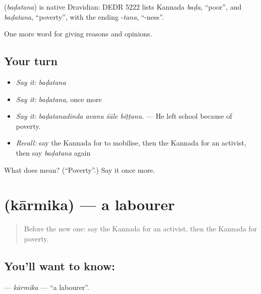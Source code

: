 \begin{cousinweb}
\textbf{} (\emph{baḍatana}) is native Dravidian: DEDR 5222 lists Kannada \emph{baḍa}, \textquotedblleft{}poor\textquotedblright{}, and \emph{baḍatana}, \textquotedblleft{}poverty\textquotedblright{}, with the ending -\emph{tana}, \textquotedblleft{}-ness\textquotedblright{}.
\end{cousinweb}

\begin{grammarlens}[title={What you've built}]
One more word for giving reasons and opinions.
\end{grammarlens}

\subsection*{Your turn}
\begin{itemize}
\raggedright
  \item \emph{Say it:} \emph{baḍatana}
  \item \emph{Say it:} \emph{baḍatana}, once more
  \item \emph{Say it:} \emph{baḍatanadinda avanu śāle biṭṭanu.} — He left school because of poverty.
  \item \emph{Recall:} say the Kannada for to mobilise, then the Kannada for an activist, then say \emph{baḍatana} again
\end{itemize}

\begin{tcolorbox}[breakable,colback=teal!4,colframe=teal!35!black,title={Before you move on}]
What does  mean? (\textquotedblleft{}Poverty\textquotedblright{}.) Say it once more.
\end{tcolorbox}
\section[\texorpdfstring{\kn{ಕಾರ್ಮಿಕ} (kārmika)}{ಕಾರ್ಮಿಕ (kārmika)}]{ (kārmika) — a labourer}

\label{lesson:KA-C399-karmika}



\begin{quote}
Before the new one: say the Kannada for an activist, then the Kannada for poverty.
\end{quote}

\subsection*{You'll want to know: }
\textbf{} — \emph{kārmika} — \textquotedblleft{}a labourer\textquotedblright{}.

